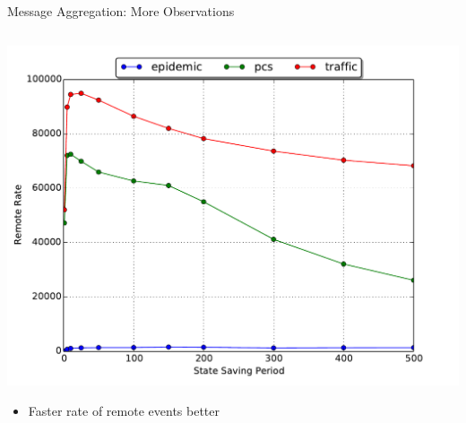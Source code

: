 \documentclass[10pt]{beamer}
\begin{document}
\begin{frame}{Message Aggregation: More Observations}

    \begin{columns}

    \begin{column}[t]{0.55\textwidth}
        \includegraphics[width=\textwidth]{../figs/state_saving/beowulf/remote_rate.pdf}
        \vspace*{-\bigskipamount}
        \begin{small}
        \begin{itemize}
            \item Faster rate of remote events better
        \end{itemize}
        \end{small}
    \end{column}


\end{columns}
\end{frame}
\end{document}
